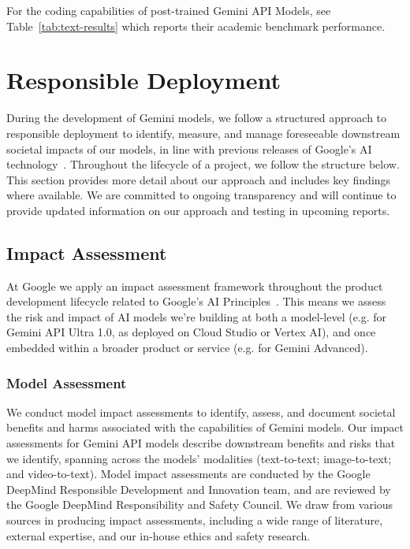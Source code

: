 For the coding capabilities of post-trained Gemini API Models, see Table~\ref{tab:text-results} which reports their academic benchmark performance.

\section{Responsible Deployment}
\label{sec:responsible-deployment}

During the development of Gemini models, we follow a structured approach to responsible deployment to identify, measure, and manage foreseeable downstream societal impacts of our models, in line with previous releases of Google’s AI technology~\citep{kavukcuogluprinciples}. Throughout the lifecycle of a project, we follow the structure below. This section provides more detail about our approach and includes key findings where available. We are committed to ongoing transparency and will continue to provide updated information on our approach and testing in upcoming reports.

\subsection{Impact Assessment} 
\label{sec:impact-assessment}
At Google we apply an impact assessment framework throughout the product development lifecycle related to Google’s AI Principles~\citep{googleaiprinciples}. This means we assess the risk and impact of AI models we’re building at both a model-level (e.g. for Gemini API Ultra 1.0, as deployed on Cloud Studio or Vertex AI), and once embedded within a broader product or service (e.g. for Gemini Advanced).

\subsubsection{Model Assessment} We conduct model impact assessments to identify, assess, and document societal benefits and harms associated with the capabilities of Gemini models. Our impact assessments for Gemini API models describe downstream benefits and risks that we identify, spanning across the models’ modalities (text-to-text; image-to-text; and video-to-text).  Model impact assessments are conducted by the Google DeepMind Responsible Development and Innovation team, and are reviewed by the Google DeepMind Responsibility and Safety Council. We draw from various sources in producing impact assessments, including a wide range of literature, external expertise, and  our in-house ethics and safety research.

